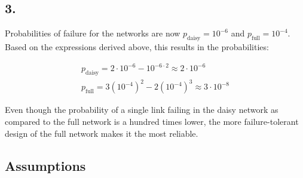 \documentclass[12pt]{article}
\begin{document}
%


\subsection*{3.}

Probabilities of failure for the networks are now $p_{\text{daisy}} = 10^{-6}$ and $p_{\text{full}} = 10^{-4}$. \\
Based on the expressions derived above, this results in the probabilities:

\begin{align*}
  p_{\text{daisy}} = 2\cdot10^{-6} - 10^{-6\cdot2} \approx 2\cdot10^{-6} \\
  p_{\text{full}} = 3(10^{-4})^2 - 2(10^{-4})^3 \approx 3\cdot10^{-8}
\end{align*}

Even though the probability of a single link failing in the daisy network as compared to the full network is a hundred times lower, the more failure-tolerant design of the full network makes it the most reliable.

\subsection*{Assumptions}
\end{document}
